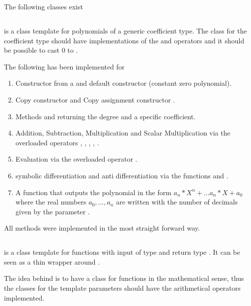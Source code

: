 		The following classes exist
		
		\subsection{\poly} 
			\textbf{} is a class template for polynomials of a generic coefficient type. 
			The class for the coefficient type should have implementations of the \code{*} and \code{+} operators
			and it should be possible to cast $0$ to .

			The following has been implemented for \poly
			\begin{enumerate}
				\item Constructor from a  and default constructor (constant zero polynomial).
				\item Copy constructor  and Copy assignment constructor .
				\item Methods  and  returning the degree and a specific coefficient.
				\item Addition, Subtraction, Multiplication and Scalar Multiplication via the overloaded operators \code{+}, \code{-}, 	\code{*}, \code{+=}, \code{*=}.
				\item Evaluation via the overloaded operator \code{()}.
				\item symbolic differentiation and anti differentiation via the functions  and .
				\item A function  that outputs the polynomial
				in the form $a_n*X^n+ \dots a_n*X + a_0$ where the real numbers $a_0, \dots, a_n$ are written with the number of decimals given by the parameter .
			\end{enumerate}
			All methods were implemented in the most straight forward way. 
		\subsection{\func}
			\textbf{} is a class template for functions with input 
			of type  and return type . 
      It can be seen as a thin wrapper around .
			
      The idea behind \func is to have a class for functions in the mathematical sense, thus the classes for the template
			parameters should have the arithmetical operators implemented.

